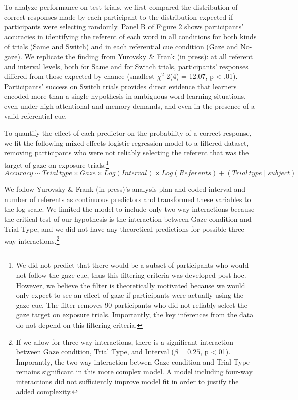 \documentclass[a4paper,man,natbib]{apa6}
\begin{document}
To analyze performance on test trials, we first compared the
distribution of correct responses made by each participant to the
distribution expected if participants were selecting randomly. Panel B
of Figure 2 shows participants' accuracies in identifying the referent
of each word in all conditions for both kinds of trials (Same and
Switch) and in each referential cue condition (Gaze and No-gaze). We
replicate the finding from Yurovsky \& Frank (in press): at all referent
and interval levels, both for Same and for Switch trials, participants'
responses differed from those expected by chance (smallest \(\chi^2\)
2(4) = 12.07, p \textless{} .01). Participants' success on Switch trials
provides direct evidence that learners encoded more than a single
hypothesis in ambiguous word learning situations, even under high
attentional and memory demands, and even in the presence of a valid
referential cue.

To quantify the effect of each predictor on the probability of a correct
response, we fit the following mixed-effects logistic regression model
to a filtered dataset, removing participants who were not reliably
selecting the referent that was the target of gaze on exposure
trials:\footnote{We did not predict that there would be a subset of participants who would not follow the gaze cue, thus this filtering criteria was developed post-hoc. However, we believe the filter is theoretically motivated because we would only expect to see an effect of gaze if participants were actually using the gaze cue. The filter removes 90 participants who did not reliably select the gaze target on exposure trials. Importantly, the key inferences from the data do not depend on this filtering criteria.}
\[Accuracy \sim Trial \, type \times Gaze \times Log(Interval) \times Log(Referents) + (Trial \, type \mid subject)\]

\noindent We follow Yurovsky \& Frank (in press)'s analysis plan and
coded interval and number of referents as continuous predictors and
transformed these variables to the log scale. We limited the model to
include only two-way interactions because the critical test of our
hypothesis is the interaction between Gaze condition and Trial Type, and
we did not have any theoretical predictions for possible three-way
interactions.\footnote{If we allow for three-way interactions, there is
  a significant interaction between Gaze condition, Trial Type, and
  Interval (\(\beta = 0.25\), p \textless{} 01). Imporantly, the two-way
  interaction betwen Gaze condition and Trial Type remains significant
  in this more complex model. A model including four-way interactions
  did not sufficiently improve model fit in order to justify the added
  complexity.}
\end{document}
